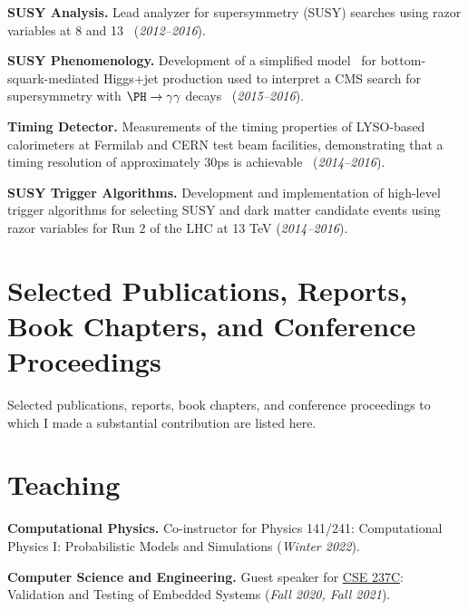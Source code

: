 \documentclass{res}
\newcommand{\MarginText}[1]{\section{#1}\vspace{10pt}}
\begin{document}
\begin{resume}
{    \textbf{SUSY Analysis.} Lead analyzer for supersymmetry (SUSY) searches using
    razor variables at 8 and 13\TeV~\cite{Khachatryan:2016epu,Duarte:2016wnw,Khachatryan:2015pwa,Duarte:2014soa} (\textit{2012--2016}).

    \textbf{SUSY Phenomenology.} Development of a simplified model~\cite{Duarte:2017bbq} for bottom-squark-mediated Higgs+jet production used to interpret a CMS search for supersymmetry with $\PH\to\gamma\gamma$ decays~\cite{Sirunyan:2017eie} (\textit{2015--2016}).

    \textbf{Timing Detector.} Measurements of the timing properties of LYSO-based calorimeters at Fermilab and CERN test beam facilities, demonstrating that a timing resolution of approximately 30\unit{ps} is achievable~\cite{Bornheim:2017gql,8069874,Anderson:2016tiu,Anderson:2016ygg,7581887,Anderson:2015gha,Anderson:2015tia,Bornheim_2015} (\textit{2014--2016}).

    \textbf{SUSY Trigger Algorithms.} Development and implementation of high-level trigger algorithms for selecting SUSY and dark matter candidate events using razor variables for Run 2 of the LHC at 13 TeV  (\textit{2014--2016}).

  }{}


  \MarginText{Selected Publications, Reports, Book Chapters, and Conference Proceedings}

  Selected publications, reports, book chapters, and conference proceedings to which I made a substantial contribution are listed here.\nocite{*}

  \vspace{10pt}
  \printbibliography[heading=none,sorting=ynt,keyword={career}]


  \MarginText{Teaching}

  \textbf{Computational Physics.} Co-instructor for Physics 141/241: Computational Physics I: Probabilistic Models and Simulations (\textit{Winter 2022}).

  \textbf{Computer Science and Engineering.} Guest speaker for \href{http://kastner.ucsd.edu/ryan/cse237c/}{CSE 237C}: Validation and Testing of Embedded Systems (\textit{Fall 2020, Fall 2021}).


\end{resume}
\end{document}
